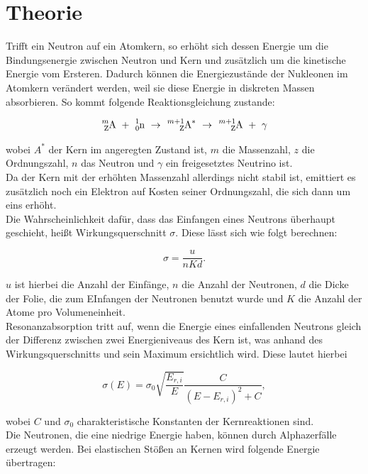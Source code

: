\section{Theorie}
\label{Theorie}

Trifft ein Neutron auf ein Atomkern, so erhöht sich dessen Energie um die Bindungsenergie zwischen Neutron und Kern und zusätzlich um die kinetische Energie vom Ersteren. Dadurch können die Energiezustände der Nukleonen im Atomkern verändert werden, weil sie diese Energie in diskreten Massen absorbieren. So kommt folgende Reaktionsgleichung zustande:

\begin{equation}
    \ce{^{m}_{Z}A}\ +\ \ce{^1_0n}\ \to\ \ce{^{m+1}_{Z}A^{*}}\ \to \ \ce{^{m+1}_{Z}A}\ +\ \gamma
\end{equation}

wobei \(A^{*}\) der Kern im angeregten Zustand ist, \(m\) die Massenzahl, \(z\) die Ordnungszahl, \(n\) das Neutron und \(\gamma\) ein freigesetztes Neutrino ist.\\
Da der Kern mit der erhöhten Massenzahl allerdings nicht stabil ist, emittiert es zusätzlich noch ein Elektron auf Kosten seiner Ordnungszahl, die sich dann um eins erhöht.\\
Die Wahrscheinlichkeit dafür, dass das Einfangen eines Neutrons überhaupt geschieht, heißt Wirkungsquerschnitt \(\sigma\). Diese lässt sich wie folgt berechnen:

\begin{equation}
    \sigma = \frac{u}{nKd}.
\end{equation}

\(u\) ist hierbei die Anzahl der Einfänge, \(n\) die Anzahl der Neutronen, \(d\) die Dicke der Folie, die zum EInfangen der Neutronen benutzt wurde und \(K\) die Anzahl der Atome pro Volumeneinheit.\\
Resonanzabsorption tritt auf, wenn die Energie eines einfallenden Neutrons gleich der Differenz zwischen zwei Energieniveaus des Kern ist, was anhand des Wirkungsquerschnitts und sein Maximum ersichtlich wird. Diese lautet hierbei

\begin{equation}
    \sigma(E) = \sigma_0 \sqrt{\frac{E_{r,i}}{E}} \frac{C}{(E-E_{r,i})^2 + C},
\end{equation}

wobei \(C\) und \(\sigma_0\) charakteristische Konstanten der Kernreaktionen sind.\\
Die Neutronen, die eine niedrige Energie haben, können durch Alphazerfälle erzeugt werden. Bei elastischen Stößen an Kernen wird folgende Energie übertragen:

